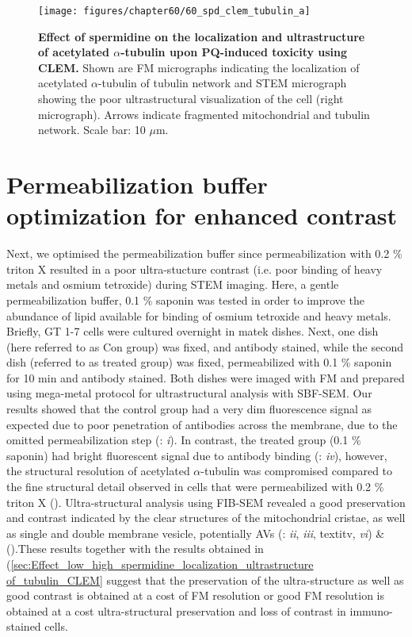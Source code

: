 \begin{landscape}
\begin{figure}[!htbp]
\center
  \texttt{[image: figures/chapter60/60\_spd\_clem\_tubulin\_a]}
  \caption[Effect of spermidine on the localization and ultrastructure of acetylated $\alpha$-tubulin upon PQ-induced toxicity using CLEM]{\textbf{Effect of spermidine on the localization and ultrastructure of acetylated $\alpha$-tubulin upon PQ-induced toxicity using CLEM.} Shown are FM micrographs indicating the localization of acetylated $\alpha$-tubulin of tubulin network and STEM micrograph showing the poor ultrastructural visualization of the cell (right micrograph). Arrows indicate fragmented mitochondrial and tubulin network. Scale bar: 10 $\mu$m.}
  \label{fig:60_spd_clem_tubulin_a}
\end{figure} 
\end{landscape}

\section{Permeabilization buffer optimization for enhanced contrast}
Next, we optimised the permeabilization buffer since permeabilization with 0.2 \% triton X resulted in a poor ultra-stucture contrast (i.e. poor binding of heavy metals and osmium tetroxide) during STEM imaging. Here, a gentle permeabilization buffer, 0.1 \% saponin was tested in order to improve the abundance of lipid available for binding of osmium tetroxide and heavy metals. Briefly, GT 1-7 cells were cultured overnight in matek dishes. Next, one dish (here referred to as Con group) was fixed, and antibody stained, while the second dish (referred to as  treated group) was fixed, permeabilized with 0.1 \% saponin for 10 min and antibody stained. Both dishes were imaged with FM and prepared using mega-metal protocol for ultrastructural analysis with SBF-SEM. Our results showed that the control group had a very dim fluorescence signal as expected due to poor penetration of antibodies across the membrane, due to the omitted permeabilization step (: \textit{i}). In contrast, the treated group (0.1 \% saponin) had bright fluorescent signal due to antibody binding (: \textit{iv}), however, the structural resolution of acetylated $\alpha$-tubulin was compromised compared to the fine structural detail observed in cells that were permeabilized with 0.2 \% triton X (). Ultra-structural analysis using FIB-SEM revealed a good preservation and contrast indicated by the clear structures of the mitochondrial cristae, as well as single and double membrane vesicle, potentially AVs (: \textit{ii}, \textit{iii}, textit{v}, \textit{vi}) \& ().These results together with the results obtained in (\cref{sec:Effect_low_high_spermidine_localization_ultrastructure of_tubulin_CLEM} suggest that the preservation of the ultra-structure as well as good contrast is obtained at a cost of FM resolution or good FM resolution is obtained at a cost ultra-structural preservation and loss of contrast in immuno-stained cells.

